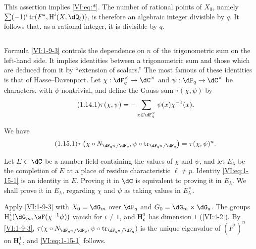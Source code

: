 This assertion implies \eqref{VI:eq:*}. The number of rational points of 
$X_0$, namely $\sum (-1)^i \tr(F^\ast,\h^i(X,\dQ_\ell))$, is therefore an 
algebraic integer divisible by $q$. It follows that, as a rational integer, 
it is divisible by $q$. 





\subsection{}\label{VI:1-14}

Formula \ref{VI:1-9-3} controls the dependence on $n$ of the trigonometric 
sum on the left-hand side. It implies identities between a 
trigonometric sum and those which are deduced from it by ``extension of 
scalars.'' The most famous of these identities is that of 
Hasse--Davenport. Let $\chi:\dF_q^\times \to \dC^\times$ and 
$\psi:\dF_q\to \dC^\times$ be characters, with $\psi$ nontrivial, and 
define the Gauss sum $\tau(\chi,\psi)$ by 
\begin{equation*}\tag{1.14.1}\label{VI:eq:1-14-1}
  \tau(\chi,\psi) = - \sum_{x\in \dF_q^\times} \psi(x) \chi^{-1}(x) \text{.}
\end{equation*}





\begin{theorem_}\label{VI:1-15}
We have 
\begin{equation*}\tag{1.15.1}\label{VI:eq:1-15-1}
  \tau\left(\chi\circ N_{\dF_{q^n}/\dF_q},\psi\circ \tr_{\dF_{q^n}/\dF_q}\right) = \tau(\chi,\psi)^n \text{.}
\end{equation*}
\end{theorem_}

Let $E\subset \dC$ be a number field containing the values of $\chi$ and 
$\psi$, and let $E_\lambda$ be the completion of $E$ at a place of residue 
characteristic $\ell\ne p$. Identity \eqref{VI:eq:1-15-1} is an identity in 
$E$. Proving it in $\dC$ is equivalent to proving it in $E_\lambda$. We 
shall prove it in $E_\lambda$, regarding $\chi$ and $\psi$ as taking values 
in $E_\lambda^\times$.

Apply \ref{VI:1-9-3} with $X_0=\dG_m$ over $\dF_q$ and 
$G_0=\dG_m\times \dG_a$. The groups $\h_c^i(\dG_m,\sF(\chi^{-1}\psi))$ vanish for 
$i\ne 1$, and $\operatorname{H}_c^1$ has dimension $1$ (\ref{VI:4-2}). By 
\ref{VI:1-9-3}, 
$\tau(\chi\circ N_{\dF_{q^n}/\dF_q},\psi\circ \tr_{\dF_{q^n}/\dF_q})$ is 
the unique eigenvalue of $(F^\ast)^n$ on $\operatorname{H}_c^1$, and \eqref{VI:eq:1-15-1} 
follows. 

